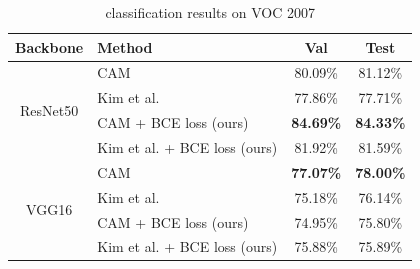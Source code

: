 \documentclass[conference]{IEEEtran}
\begin{document}
\begin{table}[t]
    \centering
    \caption{classification results on VOC 2007}
    \label{tab:classification_map_voc_2007}
    \begin{tabular}{|c|l|c|c|}
        \hline
        Backbone                     & Method                                              & Val                             & Test                            \\
        \hline
        \multirow[c]{4}{*}{ResNet50} & CAM\cite{zhou2015cnnlocalization}                   & 80.09\%                         & 81.12\%                         \\
                                     & Kim et al. \cite{kim2022bridging}                   & 77.86\%                         & 77.71\%                         \\
                                     & CAM\cite{zhou2015cnnlocalization} + BCE loss (ours) & \color{red} \bfseries{84.69\%}  & \color{red} \bfseries{84.33\%}  \\
                                     & Kim et al. \cite{kim2022bridging} + BCE loss (ours) & 81.92\%                         & 81.59\%                         \\
        \hline
        \multirow[c]{4}{*}{VGG16}    & CAM\cite{zhou2015cnnlocalization}                   & \color{blue} \bfseries{77.07\%} & \color{blue} \bfseries{78.00\%} \\
                                     & Kim et al. \cite{kim2022bridging}                   & 75.18\%                         & 76.14\%                         \\
                                     & CAM\cite{zhou2015cnnlocalization} + BCE loss (ours) & 74.95\%                         & 75.80\%                         \\
                                     & Kim et al. \cite{kim2022bridging} + BCE loss (ours) & 75.88\%                         & 75.89\%                         \\
        \hline
    \end{tabular}
\end{table}
\end{document}
